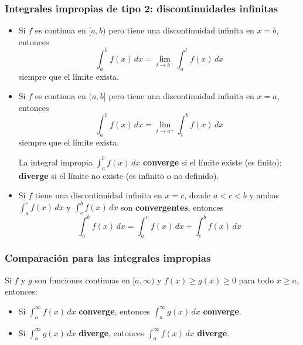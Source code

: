 \documentclass[a4paper,12pt]{article}
\theoremstyle{definition}
\begin{document}
\subsubsection{Integrales impropias de tipo 2: \textbf{discontinuidades infinitas}}
\begin{itemize}
    \item Si $f$ es continua en $[a,b)$ pero tiene una discontinuidad infinita en $x=b$, entonces
    \[ \int_{a}^{b} f(x) \, dx = \lim_{t \to b^-} \int_{a}^{t} f(x) \, dx \]
    siempre que el límite exista.

    \item Si $f$ es continua en $(a,b]$ pero tiene una discontinuidad infinita en $x=a$, entonces
    \[ \int_{a}^{b} f(x) \, dx = \lim_{t \to a^+} \int_{t}^{b} f(x) \,dx \]
    siempre que el límite exista.

    \begin{tcolorbox}
        La integral impropia $\int_{a}^{b} f(x) \, dx$ \textbf{converge} si el límite existe (es finito); \textbf{diverge} si el límite no existe (es infinito o no definido).
    \end{tcolorbox}

    \item Si $f$ tiene una discontinuidad infinita en $x=c$, donde $a < c < b$ y ambas $\int_{a}^{c} f(x) \, dx$ y $\int_{c}^{b} f(x) \, dx$ son \textbf{convergentes}, entonces
    \[ \int_{a}^{b} f(x) \, dx = \int_{a}^{c} f(x) \, dx + \int_{c}^{b} f(x) \, dx \]
\end{itemize}

\subsubsection{Comparación para las integrales impropias}
Si $f$ y $g$ son funciones continuas en $[a, \infty)$ y $f(x) \geqslant g(x) \geqslant 0$ para todo $x \geqslant a$, entonces:
\begin{itemize}
    \item Si $\int_{a}^{\infty} f(x) \,dx$ \textbf{converge}, entonces $\int_{a}^{\infty} g(x) \, dx$ \textbf{converge}.
    \item Si $\int_{a}^{\infty} g(x) \, dx$ \textbf{diverge}, entonces $\int_{a}^{\infty} f(x) \, dx$ \textbf{diverge}.
\end{itemize}
\end{document}
